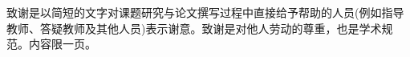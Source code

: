 \documentclass[type = master,class = professional]{whu-thesis}
\begin{document}

\tableofcontents %


\mainmatter








\printbibliography

% 

\begin{acknowledgements}
  致谢是以简短的文字对课题研究与论文撰写过程中直接给予帮助的人员(例如指导教师、答疑教师及其他人员)表示谢意。致谢是对他人劳动的尊重，也是学术规范。内容限一页。
\end{acknowledgements}


% 
\end{document}
